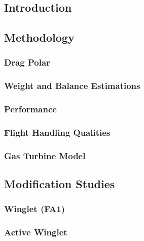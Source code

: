 \subsection{Introduction}
	

\subsection{Methodology}
        \subsubsection{Drag Polar}
	        
        \subsubsection{Weight and Balance Estimations}
	        
        \subsubsection{Performance}
	        
        \subsubsection{Flight Handling Qualities}
	        
        \subsubsection{Gas Turbine Model}
            


\subsection{Modification Studies}
	\subsubsection{Winglet (FA1)}
		
	\subsubsection{Active Winglet}
		
